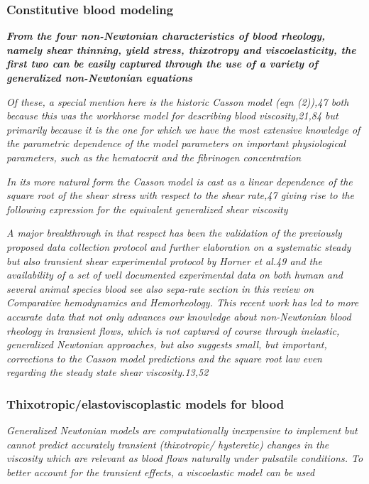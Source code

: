 \documentclass[11pt,letterpaper]{article}
\begin{document}
\subsubsection*{Constitutive blood modeling}

{\color{blue}
\textbf{\textit{ From the four non-Newtonian characteristics of blood rheology,
namely shear thinning, yield stress, thixotropy and viscoelasticity, the first two can be easily captured through the use of a variety of generalized non-Newtonian equations}}}

\textit{Of these, a special mention here is the historic Casson model (eqn (2)),47 both because this was the workhorse model for describing blood viscosity,21,84 but primarily because it is the one for which we have the most extensive knowledge of the parametric dependence of the model parameters on important physiological parameters, such as the hematocrit and the fibrinogen concentration}

\textit{In its more natural form the Casson model is cast as a linear dependence of the square root of the shear stress with respect to the shear rate,47 giving rise to the following expression for the equivalent generalized shear viscosity}

\textit{
A major breakthrough in that respect has
been the validation of the previously proposed data collection
protocol and further elaboration on a systematic steady but
also transient shear experimental protocol by Horner et al.49 and
the availability of a set of well documented experimental data on
both human and several animal species blood see also sepa-rate section in this review on Comparative hemodynamics and
Hemorheology. This recent work has led to more accurate data
that not only advances our knowledge about non-Newtonian
blood rheology in transient flows, which is not captured of course
through inelastic, generalized Newtonian approaches, but also
suggests small, but important, corrections to the Casson model
predictions and the square root law even regarding the steady
state shear viscosity.13,52}




\subsubsection*{Thixotropic/elastoviscoplastic models for blood}
\textit{Generalized Newtonian models are computationally inexpensive to implement but cannot predict accurately transient (thixotropic/ hysteretic) changes in the viscosity which are relevant as blood flows naturally under pulsatile conditions. To better account for the transient effects, a viscoelastic model can be used}
\end{document}
